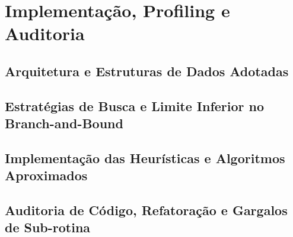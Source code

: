 \documentclass[12pt]{article}
\begin{document}
\section{Implementação, Profiling e Auditoria}

\subsection{Arquitetura e Estruturas de Dados Adotadas}

\subsection{Estratégias de Busca e Limite Inferior no Branch-and-Bound}

\subsection{Implementação das Heurísticas e Algoritmos Aproximados}

\subsection{Auditoria de Código, Refatoração e Gargalos de Sub-rotina}
\end{document}
